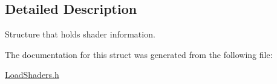 \subsection{Detailed Description}
Structure that holds shader information. 

The documentation for this struct was generated from the following file\+:\begin{DoxyCompactItemize}
\item 
\hyperlink{_load_shaders_8h}{Load\+Shaders.\+h}\end{DoxyCompactItemize}
